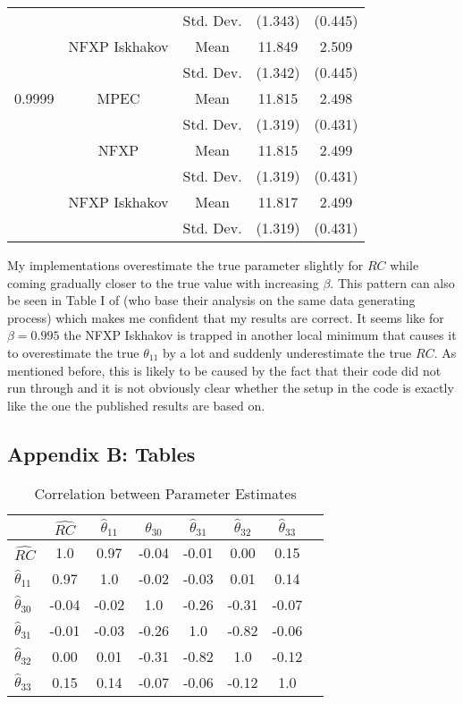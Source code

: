 \begin{table}[H]
\begin{tabular}{l c c c c}
		& & Std. Dev. & (1.343) & (0.445) \\
		& NFXP Iskhakov & Mean & 11.849 & 2.509 \\
		& & Std. Dev. & (1.342) & (0.445) \\ \midrule
		0.9999 & MPEC & Mean & 11.815 & 2.498 \\
		& & Std. Dev. & (1.319) & (0.431) \\
		& NFXP & Mean & 11.815 & 2.499 \\
		& & Std. Dev. & (1.319) & (0.431) \\
		& NFXP Iskhakov & Mean & 11.817	& 2.499 \\
		& & Std. Dev. & (1.319) & (0.431) \\ \bottomrule
	\end{tabular}
\end{table}

My implementations overestimate the true parameter slightly for $RC$ while coming gradually closer to the true value with increasing $\beta$. This pattern can also be seen in Table I of \cite{Su.Judd.2012} (who base their analysis on the same data generating process) which makes me confident that my results are correct. It seems like for $\beta = 0.995$ the NFXP Iskhakov is trapped in another local minimum that causes it to overestimate the true $\theta_{11}$ by a lot and suddenly underestimate the true $RC$. As mentioned before, this is likely to be caused by the fact that their code did not run through and it is not obviously clear whether the setup in the code is exactly like the one the published results are based on.

\subsection{Appendix B: Tables}

\begin{table}[H]
	\centering
	\caption{Correlation between Parameter Estimates}
	\label{correlation}
	\begin{tabular}{l | c c c c c c c}
		\toprule\midrule
		& $\hat{RC}$ & $\hat\theta_{11}$ & $\hat\theta_{30}$ & $\hat\theta_{31}$ & $\hat\theta_{32}$ & $\hat\theta_{33}$ \\ \midrule
		$\hat{RC}$ & 1.0 & 0.97 & -0.04 & -0.01 & 0.00 & 0.15 \\
		$\hat\theta_{11}$ & 0.97 & 1.0 & -0.02 & -0.03 & 0.01 &	0.14 \\
		$\hat\theta_{30}$ &	-0.04 &	-0.02 &	1.0	& -0.26 & -0.31 & -0.07 \\
		$\hat\theta_{31}$ &	-0.01 &	-0.03 &	-0.26 &	1.0 & -0.82 & -0.06 \\
		$\hat\theta_{32}$ &	0.00 & 0.01 & -0.31 & -0.82 & 1.0 &	-0.12 \\
		$\hat\theta_{33}$ &	0.15 & 0.14 & -0.07 & -0.06 & -0.12 & 1.0 \\
		\bottomrule
	\end{tabular}
\end{table}


